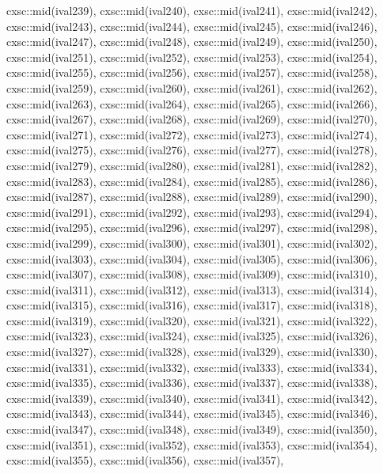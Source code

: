 \begin{DoxyCode}
{  cxsc::mid(ival239),
  cxsc::mid(ival240),
  cxsc::mid(ival241),
  cxsc::mid(ival242),
  cxsc::mid(ival243),
  cxsc::mid(ival244),
  cxsc::mid(ival245),
  cxsc::mid(ival246),
  cxsc::mid(ival247),
  cxsc::mid(ival248),
  cxsc::mid(ival249),
  cxsc::mid(ival250),
  cxsc::mid(ival251),
  cxsc::mid(ival252),
  cxsc::mid(ival253),
  cxsc::mid(ival254),
  cxsc::mid(ival255),
  cxsc::mid(ival256),
  cxsc::mid(ival257),
  cxsc::mid(ival258),
  cxsc::mid(ival259),
  cxsc::mid(ival260),
  cxsc::mid(ival261),
  cxsc::mid(ival262),
  cxsc::mid(ival263),
  cxsc::mid(ival264),
  cxsc::mid(ival265),
  cxsc::mid(ival266),
  cxsc::mid(ival267),
  cxsc::mid(ival268),
  cxsc::mid(ival269),
  cxsc::mid(ival270),
  cxsc::mid(ival271),
  cxsc::mid(ival272),
  cxsc::mid(ival273),
  cxsc::mid(ival274),
  cxsc::mid(ival275),
  cxsc::mid(ival276),
  cxsc::mid(ival277),
  cxsc::mid(ival278),
  cxsc::mid(ival279),
  cxsc::mid(ival280),
  cxsc::mid(ival281),
  cxsc::mid(ival282),
  cxsc::mid(ival283),
  cxsc::mid(ival284),
  cxsc::mid(ival285),
  cxsc::mid(ival286),
  cxsc::mid(ival287),
  cxsc::mid(ival288),
  cxsc::mid(ival289),
  cxsc::mid(ival290),
  cxsc::mid(ival291),
  cxsc::mid(ival292),
  cxsc::mid(ival293),
  cxsc::mid(ival294),
  cxsc::mid(ival295),
  cxsc::mid(ival296),
  cxsc::mid(ival297),
  cxsc::mid(ival298),
  cxsc::mid(ival299),
  cxsc::mid(ival300),
  cxsc::mid(ival301),
  cxsc::mid(ival302),
  cxsc::mid(ival303),
  cxsc::mid(ival304),
  cxsc::mid(ival305),
  cxsc::mid(ival306),
  cxsc::mid(ival307),
  cxsc::mid(ival308),
  cxsc::mid(ival309),
  cxsc::mid(ival310),
  cxsc::mid(ival311),
  cxsc::mid(ival312),
  cxsc::mid(ival313),
  cxsc::mid(ival314),
  cxsc::mid(ival315),
  cxsc::mid(ival316),
  cxsc::mid(ival317),
  cxsc::mid(ival318),
  cxsc::mid(ival319),
  cxsc::mid(ival320),
  cxsc::mid(ival321),
  cxsc::mid(ival322),
  cxsc::mid(ival323),
  cxsc::mid(ival324),
  cxsc::mid(ival325),
  cxsc::mid(ival326),
  cxsc::mid(ival327),
  cxsc::mid(ival328),
  cxsc::mid(ival329),
  cxsc::mid(ival330),
  cxsc::mid(ival331),
  cxsc::mid(ival332),
  cxsc::mid(ival333),
  cxsc::mid(ival334),
  cxsc::mid(ival335),
  cxsc::mid(ival336),
  cxsc::mid(ival337),
  cxsc::mid(ival338),
  cxsc::mid(ival339),
  cxsc::mid(ival340),
  cxsc::mid(ival341),
  cxsc::mid(ival342),
  cxsc::mid(ival343),
  cxsc::mid(ival344),
  cxsc::mid(ival345),
  cxsc::mid(ival346),
  cxsc::mid(ival347),
  cxsc::mid(ival348),
  cxsc::mid(ival349),
  cxsc::mid(ival350),
  cxsc::mid(ival351),
  cxsc::mid(ival352),
  cxsc::mid(ival353),
  cxsc::mid(ival354),
  cxsc::mid(ival355),
  cxsc::mid(ival356),
  cxsc::mid(ival357),
}
\end{DoxyCode}
